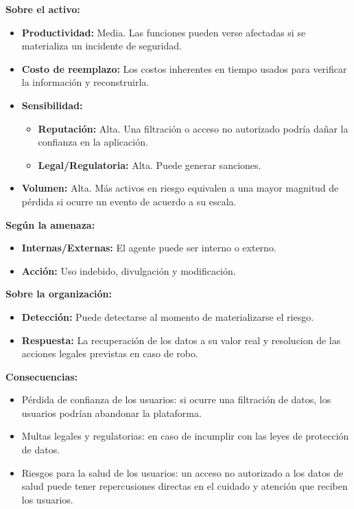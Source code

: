 \documentclass[a4paper,12pt]{article}
\begin{document}
    \par \textbf{Sobre el activo:}
    \begin{itemize}
        \item \textbf{Productividad:} Media. Las funciones pueden verse afectadas si se materializa un incidente de seguridad.
        \item \textbf{Costo de reemplazo:} Los costos inherentes en tiempo usados para verificar la información y reconstruirla.
        \item \textbf{Sensibilidad:}
        \begin{itemize}
            \item \textbf{Reputación:} Alta. Una filtración o acceso no autorizado podría dañar la confianza en la aplicación.
            \item \textbf{Legal/Regulatoria:} Alta. Puede generar sanciones.
        \end{itemize}
        \item \textbf{Volumen:} Alta. Más activos en riesgo equivalen a una mayor magnitud de pérdida si ocurre un evento de acuerdo a su escala.
    \end{itemize}
    \par \textbf{Según la amenaza:}
    \begin{itemize}
        \item \textbf{Internas/Externas:} El agente puede ser interno o externo.
        \item \textbf{Acción:} Uso indebido, divulgación y modificación.
    \end{itemize}
    \par \textbf{Sobre la organización:}
    \begin{itemize}
        \item \textbf{Detección:} Puede detectarse al momento de materializarse el riesgo.
        \item \textbf{Respuesta:} La recuperación de los datos a su valor real y resolucion de las acciones legales previstas en caso de robo.
    \end{itemize}
    \par \textbf{Consecuencias:}
    \begin{itemize}
        \item Pérdida de confianza de los usuarios: si ocurre una filtración de datos, los usuarios podrían abandonar la plataforma.
        \item Multas legales y regulatorias: en caso de incumplir con las leyes de protección de datos.
        \item Riesgos para la salud de los usuarios: un acceso no autorizado a los datos de salud puede tener repercusiones directas en el cuidado y atención que reciben los usuarios.
    \end{itemize}
\end{document}
